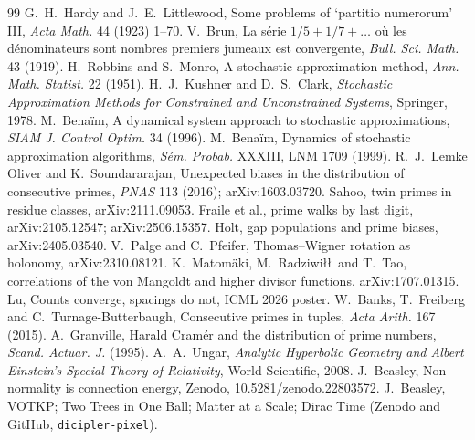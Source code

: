 \documentclass[11pt]{article}
\theoremstyle{definition}
\theoremstyle{remark}
\begin{document}
\begin{thebibliography}{99}\small
{} G.~H.~Hardy and J.~E.~Littlewood, Some problems of `partitio numerorum' III, \emph{Acta Math.} 44 (1923) 1--70.
 V.~Brun, La s\'erie $1/5+1/7+\dots$ o\`u les d\'enominateurs sont nombres premiers jumeaux est convergente, \emph{Bull. Sci. Math.} 43 (1919).
 H.~Robbins and S.~Monro, A stochastic approximation method, \emph{Ann. Math. Statist.} 22 (1951).
 H.~J.~Kushner and D.~S.~Clark, \emph{Stochastic Approximation Methods for Constrained and Unconstrained Systems}, Springer, 1978.
 M.~Bena\"im, A dynamical system approach to stochastic approximations, \emph{SIAM J. Control Optim.} 34 (1996).
 M.~Bena\"im, Dynamics of stochastic approximation algorithms, \emph{S\'em. Probab.} XXXIII, LNM 1709 (1999).
 R.~J.~Lemke Oliver and K.~Soundararajan, Unexpected biases in the distribution of consecutive primes, \emph{PNAS} 113 (2016); arXiv:1603.03720.
 Sahoo, twin primes in residue classes, arXiv:2111.09053.
 Fraile et al., prime walks by last digit, arXiv:2105.12547; arXiv:2506.15357.
 Holt, gap populations and prime biases, arXiv:2405.03540.
 V.~Palge and C.~Pfeifer, Thomas--Wigner rotation as holonomy, arXiv:2310.08121.
 K.~Matom\"aki, M.~Radziwi\l\l\ and T.~Tao, correlations of the von Mangoldt and higher divisor functions, arXiv:1707.01315.
 Lu, Counts converge, spacings do not, ICML 2026 poster.
 W.~Banks, T.~Freiberg and C.~Turnage-Butterbaugh, Consecutive primes in tuples, \emph{Acta Arith.} 167 (2015).
 A.~Granville, Harald Cram\'er and the distribution of prime numbers, \emph{Scand. Actuar. J.} (1995).
 A.~A.~Ungar, \emph{Analytic Hyperbolic Geometry and Albert Einstein's Special Theory of Relativity}, World Scientific, 2008.
 J.~Beasley, Non-normality is connection energy, Zenodo, 10.5281/zenodo.22803572.
 J.~Beasley, VOTKP; Two Trees in One Ball; Matter at a Scale; Dirac Time (Zenodo and GitHub, \texttt{dicipler-pixel}).
\end{thebibliography}
\end{document}
